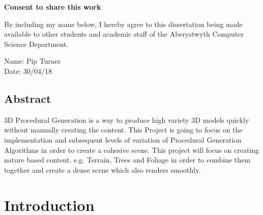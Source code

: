 \documentclass[a4paper,10pt]{report}
\begin{document}
\vspace{1em}
\begin{center}
    {\LARGE\bf Consent to share this work}
\end{center}

By including my name below, I hereby agree to this dissertation being made available to other students and academic staff of the Aberystwyth Computer Science Department.  

\vspace{2em}
Name: Pip Turner  \\

\vspace{1em}
Date: 30/04/18 \\

\setlength{\headheight}{20.2pt}
\pagestyle{fancy}
\setlength{\headsep}{0.2in}
\fancyhf{}

\fancyhead[L]{\leftmark}
\fancyhead[R]{\rightmark}

\fancyfoot[C]{\thepage}

\listoffigures
\listoftables

\tableofcontents
\clearpage



\section{Abstract}
3D Procedural Generation is a way to produce high variety 3D models quickly without manually creating the content. This Project is going to focus on the implementation and subsequent levels of variation of Procedural Generation Algorithms in order to create a cohesive scene. This project will focus on creating nature based content, e.g. Terrain, Trees and Foliage in order to combine them together and create a dense scene which also renders smoothly. 
\clearpage
\chapter{Introduction}
\end{document}
